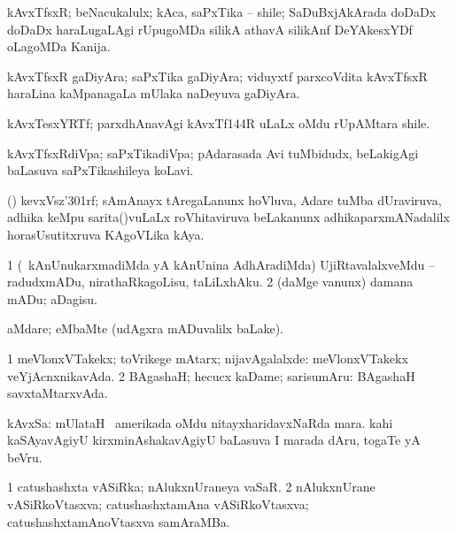 \bentry
{}
\gl{\nA}
\bmng
kAvxTfsxR; beNacukalulx; kAca, saPxTika -- shile; SaDuBxjAkArada doDaDx doDaDx haraLugaLAgi rUpugoMDa silikA athavA silikAnf DeYAkesxYDf oLagoMDa Kanija. 
\emng
\eentry

\bentry
{}
\gl{\nA}
\bmng
kAvxTfsxR gaDiyAra; saPxTika gaDiyAra; viduyxtf parxcoVdita kAvxTfsxR haraLina kaMpanagaLa mUlaka naDeyuva gaDiyAra. 
\emng
\eentry

\bentry
{}
\gl{\nA}
\bmng
kAvxTesxYRTf; parxdhAnavAgi kAvxTf\char144R uLaLx oMdu rUpAMtara shile. 
\emng
\eentry

\bentry
{}
\gl{\nA}
\bmng
kAvxTfsxRdiVpa; saPxTikadiVpa; pAdarasada Avi tuMbidudx, beLakigAgi baLasuva saPxTikashileya koLavi. 
\emng
\eentry

\bentry
{}
\gl{\nA}
\bmng
(\Kavi) kevxVsz\char'301rf; sAmAnayx tAregaLanunx hoVluva, Adare tuMba dUraviruva, adhika keMpu sarita()vuLaLx roVhitaviruva beLakanunx adhikaparxmANadalilx horasUsutitxruva KAgoVLika kAya. 
\emng
\eentry

\bentry
{}
\gl{\sakirx}
\bmng
\bnum
\num{1} (\kanmu\ kAnUnukarxmadiMda yA kAnUnina AdhAradiMda) UjiRtavalalxveMdu -- radudxmADu, nirathaRkagoLisu, taLiLxhAku. 
\num{2} (daMge \mo vanunx) damana mADu; aDagisu. 
\enum
\emng
\eentry

\bentry
{}
\gl{\kirxvi}
\bmng
aMdare; eMbaMte (udAgxra mADuvalilx baLake). 
\emng
\eentry

\bentry
{}
\gl{\sapUpa}
\bmng
\bnum
\num{1} meVlonxVTakekx; toVrikege mAtarx; nijavAgalalxde:  meVlonxVTakekx veYjAcnxnikavAda. 
\num{2} BAgashaH; hecucx kaDame; sarisumAru:  BAgashaH savxtaMtarxvAda. 
\enum
\emng
\eentry

\bentry
{}
\gl{\nA}
\bmng
kAvxSa: 
\banum
{} mUlataH \da\ amerikada oMdu nitayxharidavxNaRda mara. 
 kahi kaSAyavAgiyU kirxminAshakavAgiyU baLasuva I marada dAru, togaTe yA beVru. 
\eanum
\emng
\eentry

\bentry
{}
\gl{\nA}
\bmng
\bnum
\num{1} catushashxta vASiRka; nAlukxnUraneya vaSaR. 
\num{2} nAlukxnUrane vASiRkoVtasxva; catushashxtamAna vASiRkoVtasxva; catushashxtamAnoVtasxva samAraMBa. 
\enum
\emng
\eentry

